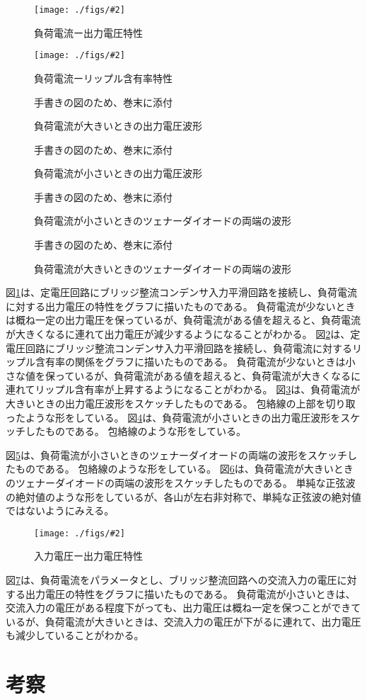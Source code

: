 \documentclass[11pt]{jsarticle}
\newcommand{\fg}[3]{ %
    \begin{figure}
        \begin{center}
            \texttt{[image: ./figs/\#2]}
            \caption{#3}
            \label{#1}
        \end{center}
    \end{figure}
}
\newcommand{\dummyfig}[2]{
    \begin{figure}
        \begin{center}
            \begin{shadebox}
                手書きの図のため、巻末に添付
            \end{shadebox}
            \caption{#2}
            \label{#1}
        \end{center}
    \end{figure}
}
\newcommand{\fr}[1]{図\ref{#1}}
\begin{document}
\fg{fig20}{{6.voltage}.png}{負荷電流ー出力電圧特性}
\fg{fig21}{{6.ripple}.png}{負荷電流ーリップル含有率特性}
\dummyfig{fig22-1}{負荷電流が大きいときの出力電圧波形}
\dummyfig{fig22-2}{負荷電流が小さいときの出力電圧波形}
\dummyfig{fig23-1}{負荷電流が小さいときのツェナーダイオードの両端の波形}
\dummyfig{fig23-2}{負荷電流が大きいときのツェナーダイオードの両端の波形}
\fr{fig20}は、定電圧回路にブリッジ整流コンデンサ入力平滑回路を接続し、負荷電流に対する出力電圧の特性をグラフに描いたものである。
負荷電流が少ないときは概ね一定の出力電圧を保っているが、負荷電流がある値を超えると、負荷電流が大きくなるに連れて出力電圧が減少するようになることがわかる。
\fr{fig21}は、定電圧回路にブリッジ整流コンデンサ入力平滑回路を接続し、負荷電流に対するリップル含有率の関係をグラフに描いたものである。
負荷電流が少ないときは小さな値を保っているが、負荷電流がある値を超えると、負荷電流が大きくなるに連れてリップル含有率が上昇するようになることがわかる。
\fr{fig22-1}は、負荷電流が大きいときの出力電圧波形をスケッチしたものである。
包絡線の上部を切り取ったような形をしている。
\fr{fig22-2}は、負荷電流が小さいときの出力電圧波形をスケッチしたものである。
包絡線のような形をしている。

\fr{fig23-1}は、負荷電流が小さいときのツェナーダイオードの両端の波形をスケッチしたものである。
包絡線のような形をしている。
\fr{fig23-2}は、負荷電流が大きいときのツェナーダイオードの両端の波形をスケッチしたものである。
単純な正弦波の絶対値のような形をしているが、各山が左右非対称で、単純な正弦波の絶対値ではないようにみえる。

\fg{fig24}{{7.output}.png}{入力電圧ー出力電圧特性}
\fr{fig24}は、負荷電流をパラメータとし、ブリッジ整流回路への交流入力の電圧に対する出力電圧の特性をグラフに描いたものである。
負荷電流が小さいときは、交流入力の電圧がある程度下がっても、出力電圧は概ね一定を保つことができているが、負荷電流が大きいときは、交流入力の電圧が下がるに連れて、出力電圧も減少していることがわかる。

\section{考察}
\end{document}
